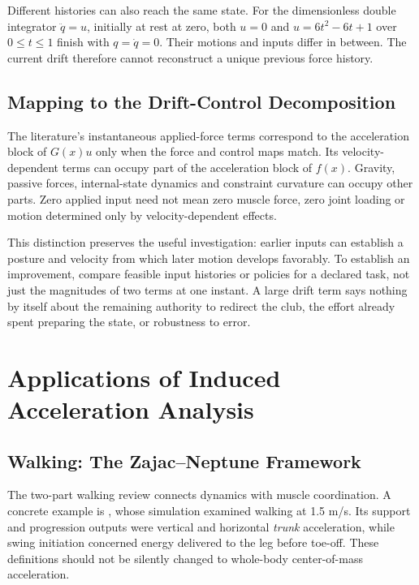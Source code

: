 Different histories can also reach the same state. For the dimensionless double integrator $\ddot q=u$, initially at rest at zero, both $u=0$ and $u=6t^2-6t+1$ over $0\le t\le1$ finish with $q=\dot q=0$. Their motions and inputs differ in between. The current drift therefore cannot reconstruct a unique previous force history.

\subsection{Mapping to the Drift-Control Decomposition}

The literature's instantaneous applied-force terms correspond to the acceleration block of $G(x)u$ only when the force and control maps match. Its velocity-dependent terms can occupy part of the acceleration block of $f(x)$. Gravity, passive forces, internal-state dynamics and constraint curvature can occupy other parts. Zero applied input need not mean zero muscle force, zero joint loading or motion determined only by velocity-dependent effects.

This distinction preserves the useful investigation: earlier inputs can establish a posture and velocity from which later motion develops favorably. To establish an improvement, compare feasible input histories or policies for a declared task, not just the magnitudes of two terms at one instant. A large drift term says nothing by itself about the remaining authority to redirect the club, the effort already spent preparing the state, or robustness to error.

\section{Applications of Induced Acceleration Analysis}
\label{sec:iaa_applications}

\subsection{Walking: The Zajac--Neptune Framework}

The two-part walking review \cite{Zajac2002,Zajac2003} connects dynamics with muscle coordination. A concrete example is \cite{Neptune2001}, whose simulation examined walking at 1.5 m/s. Its support and progression outputs were vertical and horizontal \emph{trunk} acceleration, while swing initiation concerned energy delivered to the leg before toe-off. These definitions should not be silently changed to whole-body center-of-mass acceleration.

